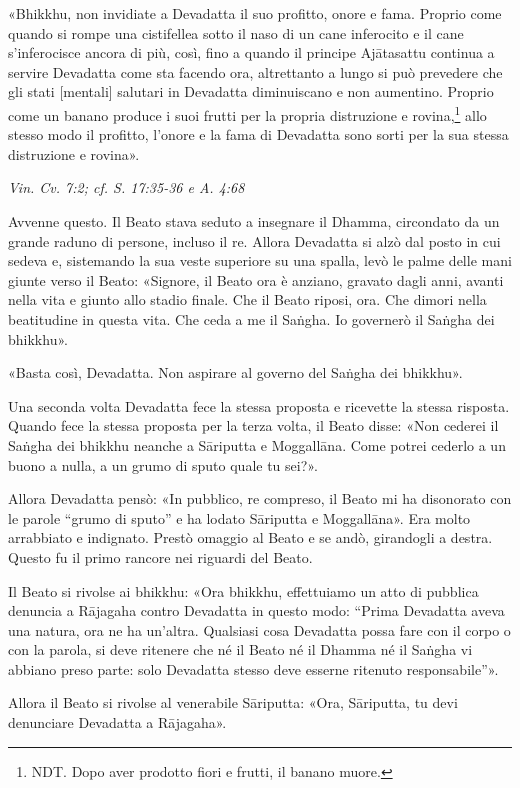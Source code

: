 «Bhikkhu, non invidiate a Devadatta il suo profitto, onore e fama.
Proprio come quando si rompe una cistifellea sotto il naso di un cane
inferocito e il cane s’inferocisce ancora di più, così, fino a quando il
principe Ajātasattu continua a servire Devadatta come sta facendo ora,
altrettanto a lungo si può prevedere che gli stati [mentali] salutari in
Devadatta diminuiscano e non aumentino. Proprio come un banano produce i
suoi frutti per la propria distruzione e rovina,\footnote{NDT. Dopo aver prodotto fiori e frutti, il banano muore.} allo
stesso modo il profitto, l’onore e la fama di Devadatta sono sorti per
la sua stessa distruzione e rovina».


\emph{Vin. Cv. 7:2; cf. S. 17:35-36 e A. 4:68}


Avvenne questo. Il Beato stava seduto a insegnare il Dhamma, circondato
da un grande raduno di persone, incluso il re. Allora Devadatta si alzò
dal posto in cui sedeva e, sistemando la sua veste superiore su una
spalla, levò le palme delle mani giunte verso il Beato: «Signore, il
Beato ora è anziano, gravato dagli anni, avanti nella vita e giunto allo
stadio finale. Che il Beato riposi, ora. Che dimori nella beatitudine in
questa vita. Che ceda a me il Saṅgha. Io governerò il Saṅgha dei
bhikkhu».


«Basta così, Devadatta. Non aspirare al governo del Saṅgha dei bhikkhu».


Una seconda volta Devadatta fece la stessa proposta e ricevette la
stessa risposta. Quando fece la stessa proposta per la terza volta, il
Beato disse: «Non cederei il Saṅgha dei bhikkhu neanche a Sāriputta e
Moggallāna. Come potrei cederlo a un buono a nulla, a un grumo di sputo
quale tu sei?».


Allora Devadatta pensò: «In pubblico, re compreso, il Beato mi ha
disonorato con le parole “grumo di sputo” e ha lodato Sāriputta e
Moggallāna». Era molto arrabbiato e indignato. Prestò omaggio al Beato e
se andò, girandogli a destra. Questo fu il primo rancore nei riguardi
del Beato.


Il Beato si rivolse ai bhikkhu: «Ora bhikkhu, effettuiamo un atto di
pubblica denuncia a Rājagaha contro Devadatta in questo modo: “Prima
Devadatta aveva una natura, ora ne ha un’altra. Qualsiasi cosa Devadatta
possa fare con il corpo o con la parola, si deve ritenere che né il
Beato né il Dhamma né il Saṅgha vi abbiano preso parte: solo Devadatta
stesso deve esserne ritenuto responsabile”».


Allora il Beato si rivolse al venerabile Sāriputta: «Ora, Sāriputta, tu
devi denunciare Devadatta a Rājagaha».


